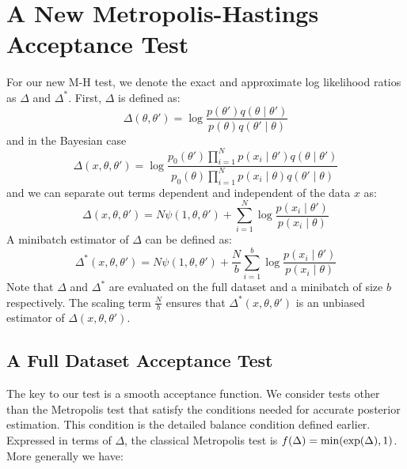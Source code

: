 \documentclass{article}
\begin{document}




\section{A New Metropolis-Hastings Acceptance Test}\label{sec:our_algorithm}

For our new M-H test, we denote the exact and approximate log likelihood ratios as $\Delta$ and $\Delta^*$.
First, $\Delta$ is defined as:
\begin{equation}\label{eq:delta0}
  \Delta(\theta,\theta') = \log\frac{p(\theta')q(\theta\mid\theta')}{p(\theta)q(\theta'\mid\theta)}
\end{equation}
and in the Bayesian case
\begin{equation}\label{eq:delta1}
\Delta(x,\theta,\theta')  =
\log \frac{p_0(\theta')\prod_{i=1}^N p(x_i \mid \theta')q(\theta \mid
  \theta')}{p_0(\theta)\prod_{i=1}^N p(x_i \mid \theta)q(\theta' \mid\theta)}
  \end{equation}
and we can separate out terms dependent and independent of the data $x$ as:
\begin{equation}\label{eq:delta2}
\Delta(x,\theta,\theta') = N\psi(1,\theta,\theta') + \sum_{i=1}^N\log\frac{p(x_i\mid\theta')}{p(x_i\mid\theta)}
\end{equation}
A minibatch estimator of $\Delta$ can be defined as:
\begin{equation}\label{eq:delta3}
    \Delta^*(x,\theta,\theta') =
N\psi(1,\theta,\theta') + \frac{N}{b}\sum_{i=1}^b\log\frac{p(x_i\mid\theta')}{p(x_i\mid\theta)}
\end{equation}
Note that $\Delta$ and $\Delta^*$ are evaluated on the full dataset and a minibatch of size $b$
respectively. The scaling term $\frac{N}{b}$ ensures that $\Delta^*(x,\theta,\theta')$ is an
unbiased estimator of $\Delta(x,\theta,\theta')$.

\subsection{A Full Dataset Acceptance Test}\label{ssec:deltas_full}

The key to our test is a smooth acceptance function.  We consider tests other than the Metropolis
test that satisfy the conditions needed for accurate posterior estimation. This condition is
the detailed balance condition defined earlier. Expressed in terms of $\Delta$, the
classical Metropolis test is $f(\Delta) = {\rm min}(\exp(\Delta),1)$. More generally we have:
\end{document}
